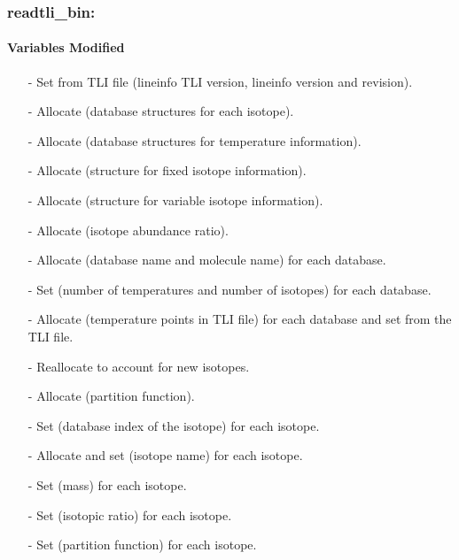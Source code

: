 \documentclass[letterpaper,12pt]{article}
\begin{document}
\subsubsection{readtli\_bin:}
\paragraph{Variables Modified}
\begin{enumerate}[leftmargin=10pt, noitemsep, parsep=0pt, topsep=0ex]
\item[-] Set  from TLI file (lineinfo TLI version, lineinfo
  version and revision).
\item[-] Allocate  (database structures for each isotope).
\item[-] Allocate  (database structures for temperature information).
\item[-] Allocate  (structure for fixed isotope information).
\item[-] Allocate  (structure for variable isotope information).
\item[-] Allocate  (isotope abundance ratio).
\item[-] Allocate  (database name and molecule name) for each database.
\item[-] Set  (number of temperatures and number of isotopes) for each database.
\item[-] Allocate  (temperature points in TLI file) for each database and set from the TLI file.
\item[-] Reallocate  to account for new isotopes.
\item[-] Allocate  (partition function).
\item[-] Set  (database index of the isotope) for each isotope.
\item[-] Allocate and set  (isotope name) for each isotope.
\item[-] Set  (mass) for each isotope.
\item[-] Set  (isotopic ratio) for each isotope.
\item[-] Set  (partition function) for each isotope.

\end{enumerate}
\end{document}
